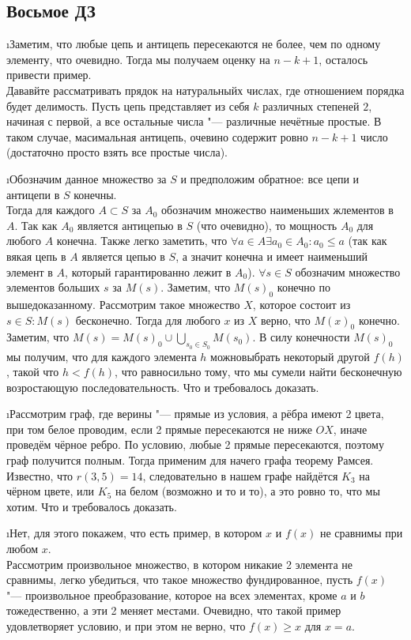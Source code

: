 \subsection{Восьмое ДЗ}


\i Заметим, что любые цепь и антицепь пересекаются не более, чем по одному элементу, что очевидно. Тогда мы получаем оценку на $n-k+1$, осталось привести пример.\\
Дававйте рассматривать прядок на натуральныйх числах, где отношением порядка будет делимость. Пусть цепь представляет из себя $k$ различных степеней $2$, начиная с первой, а все остальные числа "--- различные нечётные простые. В таком случае, масимальная антицепь, очевино содержит ровно $n-k+1$ число (достаточно просто взять все простые числа).

\i Обозначим данное множество за $S$ и предположим обратное: все цепи и антицепи в $S$ конечны.\\
Тогда для каждого $A \subset S$ за $A_0$ обозначим множество наименьших жлементов в $A$. Так как $A_0$ является антицепью в $S$ (что очевидно), то мощность $A_0$ для любого $A$ конечна. Также легко заметить, что $\forall a \in A \exists a_0 \in A_0: a_0 \leq a$ (так как вякая цепь в $A$ является цепью в $S$, а значит конечна и имеет наименьший элемент в $A$, который гарантированно лежит в $A_0$).
$\forall s \in S$ обозначим множество элементов больших $s$ за $M(s)$. Заметим, что $M(s)_0$ конечно по вышедоказанному. Рассмотрим такое множество $X$, которое состоит из $s \in S: M(s)$ бесконечно. Тогда для любого $x$ из $X$ верно, что $M(x)_0$ конечно.\\
Заметим, что $M(s) = M(s)_0 \cup \bigcup\limits_{s_0 \in S_0} M(s_0)$. В силу конечности $M(s)_0$ мы получим, что для каждого элемента $h$ можновыбрать некоторый другой $f(h)$, такой что $h < f(h)$, что равносильно тому, что мы сумели найти бесконечную возростающую последовательность. Что и требовалось доказать.

\i Рассмотрим граф, где верины "--- прямые из условия, а рёбра имеют 2 цвета, при том белое проводим, если 2 прямые пересекаются не ниже $OX$, иначе проведём чёрное ребро. По условию, любые 2 прямые пересекаются, поэтому граф получится полным. Тогда применим для начего графа теорему Рамсея. Известно, что $r(3, 5) = 14$, следовательно в нашем графе найдётся $K_3$ на чёрном цвете, или $K_5$ на белом (возможно и то и то), а это ровно то, что мы хотим. Что и требовалось доказать.

\i Нет, для этого покажем, что есть пример, в котором $x$ и $f(x)$ не сравнимы при любом $x$.\\
Рассмотрим произвольное множество, в котором никакие 2 элемента не сравнимы, легко убедиться, что такое множество фундированное, пусть $f(x)$ "--- произвольное преобразование, которое на всех элементах, кроме $a$ и $b$ тожедественно, а эти 2 меняет местами. Очевидно, что такой пример удовлетворяет условию, и при этом не верно, что $f(x) \geq x$ для $x = a$.

